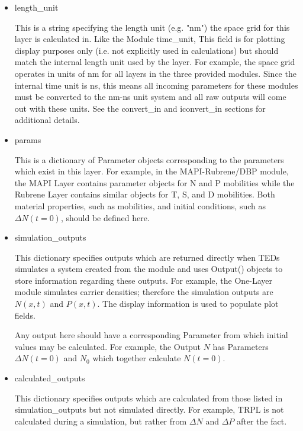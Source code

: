 \documentclass[11pt,letterpaper,titlepage]{article}
\begin{document}
		\begin{itemize}
			\item length\_unit
			\par This is a string specifying the length unit (e.g. "nm") the space grid for this layer is calculated in. Like the Module time\_unit, This field is for plotting display purposes only (i.e. not explicitly used in calculations) but should match the internal length unit used by the layer. For example, the space grid operates in units of nm for all layers in the three provided modules. Since the internal time unit is ns, this means all incoming parameters for these modules must be converted to the nm-ns unit system and all raw outputs will come out with these units. See the convert\_in and iconvert\_in sections for additional details.
			
			\item params
			\par This is a dictionary of Parameter objects corresponding to the parameters which exist in this layer. For example, in the MAPI-Rubrene/DBP module, the MAPI Layer contains parameter objects for N and P mobilities while the Rubrene Layer contains similar objects for T, S, and D mobilities. Both material properties, such as mobilities, and initial conditions, such as $\Delta N(t=0)$, should be defined here.
			
			\item simulation\_outputs
			\par This dictionary specifies outputs which are returned directly when TEDs simulates a system created from the module and uses Output() objects to store information regarding these outputs. For example, the One-Layer module simulates carrier densities; therefore the simulation outputs are $N(x,t)$ and $P(x,t)$. The display information is used to populate plot fields.
			
			\par Any output here should have a corresponding Parameter from which initial values may be calculated. For example, the Output $N$ has Parameters $\Delta N(t=0)$ and $N_0$ which together calculate $N(t=0)$.
			
			\item calculated\_outputs
			\par This dictionary specifies outputs which are calculated from those listed in simulation\_outputs but not simulated directly. For example, TRPL is not calculated during a simulation, but rather from $\Delta N$ and $\Delta P$ after the fact.
			

\end{itemize}
\end{document}
